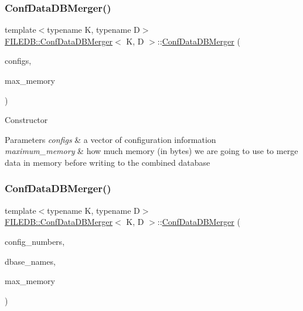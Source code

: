 \subsubsection{\texorpdfstring{ConfDataDBMerger()}{ConfDataDBMerger()}\hspace{0.1cm}{\footnotesize\ttfamily [1/6]}}
{\footnotesize\ttfamily template$<$typename K, typename D$>$ \\
\mbox{\hyperlink{classFILEDB_1_1ConfDataDBMerger}{F\+I\+L\+E\+D\+B\+::\+Conf\+Data\+D\+B\+Merger}}$<$ K, D $>$\+::\mbox{\hyperlink{classFILEDB_1_1ConfDataDBMerger}{Conf\+Data\+D\+B\+Merger}} (\begin{DoxyParamCaption}\item[{const std\+::vector$<$ \mbox{\hyperlink{classFILEDB_1_1ConfigInfo}{Config\+Info}} $>$ \&}]{configs,  }\item[{unsigned int}]{max\+\_\+memory }\end{DoxyParamCaption})\hspace{0.3cm}{\ttfamily [inline]}}

Constructor 
\begin{DoxyParams}{Parameters}
{\em configs} & a vector of configuration information \\
\hline
{\em maximum\+\_\+memory} & how much memory (in bytes) we are going to use to merge data in memory before writing to the combined database \\
\hline
\end{DoxyParams}
\mbox{\label{classFILEDB_1_1ConfDataDBMerger_a495cdfd447f2ed64776d87601c36a05b}} 
\subsubsection{\texorpdfstring{ConfDataDBMerger()}{ConfDataDBMerger()}\hspace{0.1cm}{\footnotesize\ttfamily [2/6]}}
{\footnotesize\ttfamily template$<$typename K, typename D$>$ \\
\mbox{\hyperlink{classFILEDB_1_1ConfDataDBMerger}{F\+I\+L\+E\+D\+B\+::\+Conf\+Data\+D\+B\+Merger}}$<$ K, D $>$\+::\mbox{\hyperlink{classFILEDB_1_1ConfDataDBMerger}{Conf\+Data\+D\+B\+Merger}} (\begin{DoxyParamCaption}\item[{const std\+::vector$<$ int $>$ \&}]{config\+\_\+numbers,  }\item[{const std\+::vector$<$ std\+::string $>$ \&}]{dbase\+\_\+names,  }\item[{unsigned int}]{max\+\_\+memory }\end{DoxyParamCaption})\hspace{0.3cm}{\ttfamily [inline]}}

